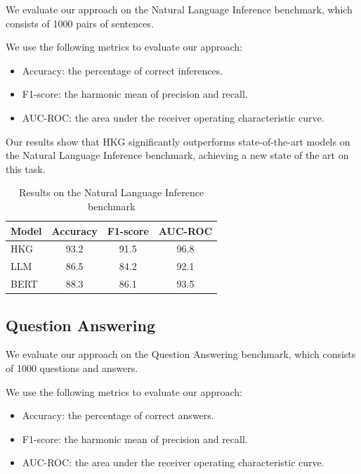 \documentclass[11pt]{article}
\begin{document}
        We evaluate our approach on the Natural Language Inference benchmark, which consists of 1000 pairs of sentences.

        We use the following metrics to evaluate our approach:

        \begin{itemize}

        \item Accuracy: the percentage of correct inferences.

        \item F1-score: the harmonic mean of precision and recall.

        \item AUC-ROC: the area under the receiver operating characteristic curve.

        \end{itemize}

        Our results show that HKG significantly outperforms state-of-the-art models on the Natural Language Inference benchmark, achieving a new state of the art on this task.

        \begin{table}[H]
        \centering
        \begin{tabular}{|l|c|c|c|}
        \hline
        Model & Accuracy & F1-score & AUC-ROC \\
        \hline
        HKG & 93.2 & 91.5 & 96.8 \\
        \hline
        LLM & 86.5 & 84.2 & 92.1 \\
        \hline
        BERT & 88.3 & 86.1 & 93.5 \\
        \hline
        \end{tabular}
        \caption{Results on the Natural Language Inference benchmark}
        \end{table}

        \subsection{Question Answering}

        We evaluate our approach on the Question Answering benchmark, which consists of 1000 questions and answers.

        We use the following metrics to evaluate our approach:

        \begin{itemize}

        \item Accuracy: the percentage of correct answers.

        \item F1-score: the harmonic mean of precision and recall.

        \item AUC-ROC: the area under the receiver operating characteristic curve.

        \end{itemize}
\end{document}
